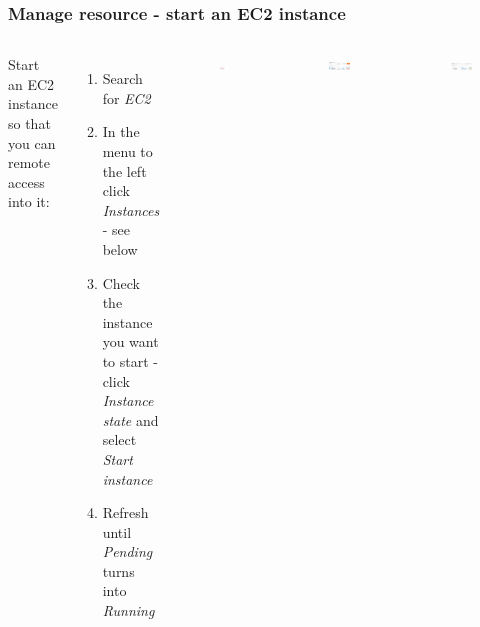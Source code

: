 \documentclass[aspectratio=169]{beamer} %
\begin{document}
\begin{frame}
	\frametitle{Manage resource - start an EC2 instance}
	
	\begin{columns}[c]
		
		
		Start an EC2 instance so that you can remote access into it:
			
		\begin{enumerate}
			\item Search for \textit{EC2}
			\item In the menu to the left click \textit{Instances} - see below
			\item Check the instance you want to start - click \textit{Instance state} and select \textit{Start instance}
			\item Refresh until \textit{Pending} turns into \textit{Running}
			
		\end{enumerate}
		
		\begin{figure}
			\centering
			\includegraphics[width=.4\textwidth]{./img/ec2-1.png}
		\end{figure}
		
		
		\begin{figure}
			\centering
			\includegraphics[width=1\textwidth]{./img/ec2-2.png}
		\end{figure}
		\begin{figure}
			\centering
			\includegraphics[width=1\textwidth]{./img/ec2-3.png}
		\end{figure}
		\vspace{.5cm}
		
	\end{columns}
\end{frame}
\end{document}

